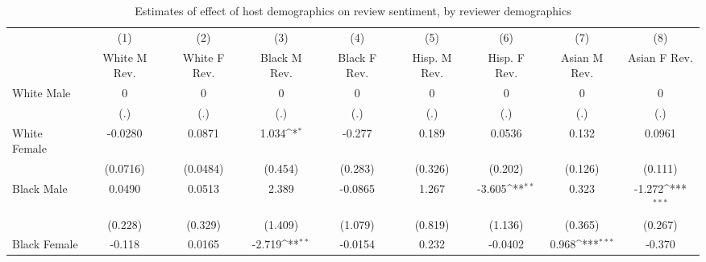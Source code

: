 \begin{sidewaystable}

{
\def\sym#1{\ifmmode^{#1}\else\(^{#1}\)\fi}
\begin{longtable}{l*{8}{c}}
\caption{Estimates of effect of host demographics on review sentiment, by reviewer demographics}\\
\hline\hline\endfirsthead\hline\endhead\hline\endfoot\endlastfoot
                    &\multicolumn{1}{c}{(1)}&\multicolumn{1}{c}{(2)}&\multicolumn{1}{c}{(3)}&\multicolumn{1}{c}{(4)}&\multicolumn{1}{c}{(5)}&\multicolumn{1}{c}{(6)}&\multicolumn{1}{c}{(7)}&\multicolumn{1}{c}{(8)}\\
                    &\multicolumn{1}{c}{White M Rev.}&\multicolumn{1}{c}{White F Rev.}&\multicolumn{1}{c}{Black M Rev.}&\multicolumn{1}{c}{Black F Rev.}&\multicolumn{1}{c}{Hisp. M Rev.}&\multicolumn{1}{c}{Hisp. F Rev.}&\multicolumn{1}{c}{Asian M Rev.}&\multicolumn{1}{c}{Asian F Rev.}\\
\hline
White Male          &           0         &           0         &           0         &           0         &           0         &           0         &           0         &           0         \\
                    &         (.)         &         (.)         &         (.)         &         (.)         &         (.)         &         (.)         &         (.)         &         (.)         \\
[1em]
White Female        &     -0.0280         &      0.0871         &       1.034\sym{*}  &      -0.277         &       0.189         &      0.0536         &       0.132         &      0.0961         \\
                    &    (0.0716)         &    (0.0484)         &     (0.454)         &     (0.283)         &     (0.326)         &     (0.202)         &     (0.126)         &     (0.111)         \\
[1em]
Black Male          &      0.0490         &      0.0513         &       2.389         &     -0.0865         &       1.267         &      -3.605\sym{**} &       0.323         &      -1.272\sym{***}\\
                    &     (0.228)         &     (0.329)         &     (1.409)         &     (1.079)         &     (0.819)         &     (1.136)         &     (0.365)         &     (0.267)         \\
[1em]
Black Female        &      -0.118         &      0.0165         &      -2.719\sym{**} &     -0.0154         &       0.232         &     -0.0402         &       0.968\sym{***}&      -0.370         \\

\end{longtable}}
\end{sidewaystable}
